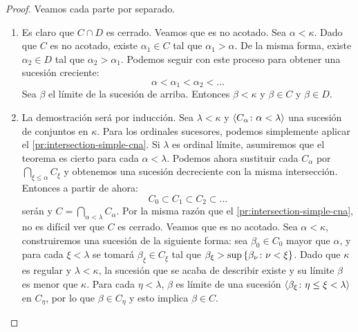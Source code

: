 \begin{proof}
    Veamos cada parte por separado.

    \begin{enumerate}[label=\alph*)]
        \item\label{pr:intersection-simple-cna}
            Es claro que $C\cap D$ es cerrado. Veamos que es no acotado.
            Sea $\alpha<\kappa$. Dado que $C$ es no acotado, existe $\alpha_1\in C$
            tal que $\alpha_1 > \alpha$. De la misma forma, existe $\alpha_2\in D$
            tal que $\alpha_2 > \alpha_1$. Podemos seguir con este proceso para obtener
            una sucesión creciente:
            \[
                \alpha < \alpha_1 < \alpha_2 < \dots
            \]
            Sea $\beta$ el límite de la sucesión de arriba.
            Entonces $\beta < \kappa$ y $\beta\in C$ y $\beta\in D$.


        \item\label{pr:intersection-cna}
            La demostración será por inducción.
            Sea $\lambda<\kappa$ y $\langle C_\alpha\colon\alpha<\lambda \rangle$
            una sucesión de conjuntos \cna{} en $\kappa$.
            Para los ordinales sucesores, podemos simplemente aplicar
            el \cref{pr:intersection-simple-cna}.
            Si $\lambda$ es ordinal límite, asumiremos que el teorema
            es cierto para cada $\alpha<\lambda$. Podemos ahora sustituir
            cada $C_\alpha$ por $\bigcap_{\xi\leq\alpha} C_\xi$ y obtenemos
            una sucesión decreciente con la misma intersección. Entonces a partir de ahora:
            \[
                C_0 \subset C_1 \subset C_2 \subset \dots
            \]
            serán \cna{} y $C = \bigcap_{\alpha<\lambda} C_\alpha$.
            Por la misma razón que el \cref{pr:intersection-simple-cna}, no es difícil
            ver que $C$ es cerrado. Veamos que es no acotado. Sea $\alpha<\kappa$,
            construiremos una sucesión de la siguiente forma: sea $\beta_0\in C_0$ mayor que
            $\alpha$, y para cada $\xi<\lambda$ se tomará $\beta_\xi\in C_\xi$
            tal que $\beta_\xi > \sup\left\{ \beta_\nu\colon\nu<\xi \right\}$.
            Dado que $\kappa$ es regular y $\lambda<\kappa$, la sucesión que se acaba de
            describir existe y su límite $\beta$ es menor que $\kappa$.
            Para cada $\eta<\lambda$, $\beta$ es límite de una sucesión
            $\langle \beta_\xi\colon\eta\leq\xi<\lambda \rangle$ en $C_\eta$, por lo que
            $\beta\in C_\eta$ y esto implica $\beta\in C$.



\end{enumerate}
\end{proof}
